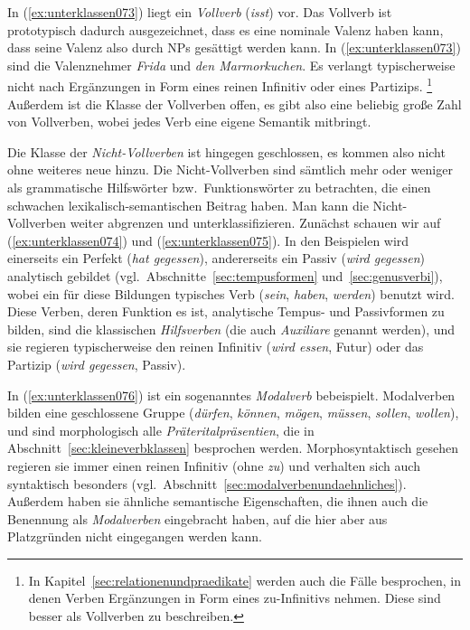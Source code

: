 In (\ref{ex:unterklassen073}) liegt ein \textit{Vollverb} (\textit{isst}) vor.
Das Vollverb ist prototypisch dadurch ausgezeichnet, dass es eine nominale Valenz haben kann, dass seine Valenz also durch NPs gesättigt werden kann.
In (\ref{ex:unterklassen073}) sind die Valenznehmer \textit{Frida} und \textit{den Marmorkuchen}.
Es verlangt typischerweise nicht nach Ergänzungen in Form eines reinen Infinitiv oder eines Partizips.%
\footnote{In Kapitel~\ref{sec:relationenundpraedikate} werden auch die Fälle besprochen, in denen Verben Ergänzungen in Form eines zu-Infinitivs nehmen.
Diese sind besser als Vollverben zu beschreiben.}
Außerdem ist die Klasse der Vollverben offen, es gibt also eine beliebig große Zahl von Vollverben, wobei jedes Verb eine eigene Semantik mitbringt.


Die Klasse der \textit{Nicht-Vollverben} ist hingegen geschlossen, es kommen also nicht ohne weiteres neue hinzu.
Die Nicht-Vollverben sind sämtlich mehr oder weniger als grammatische Hilfswörter bzw.\ Funktionswörter zu betrachten, die einen schwachen lexikalisch-semantischen Beitrag haben.
Man kann die Nicht-Vollverben weiter abgrenzen und unterklassifizieren.
Zunächst schauen wir auf (\ref{ex:unterklassen074}) und (\ref{ex:unterklassen075}).
In den Beispielen wird einerseits ein Perfekt (\textit{hat gegessen}), andererseits ein Passiv (\textit{wird gegessen}) analytisch gebildet (vgl.\ Abschnitte~\ref{sec:tempusformen} und~\ref{sec:genusverbi}), wobei ein für diese Bildungen typisches Verb (\textit{sein}, \textit{haben}, \textit{werden}) benutzt wird.
Diese Verben, deren Funktion es ist, analytische Tempus- und Passivformen zu bilden, sind die klassischen \textit{Hilfsverben} (die auch \textit{Auxiliare} genannt werden), und sie regieren typischerweise den reinen Infinitiv (\textit{wird essen}, Futur) oder das Partizip (\textit{wird gegessen}, Passiv).


In (\ref{ex:unterklassen076}) ist ein sogenanntes \textit{Modalverb} bebeispielt.
Modalverben bilden eine geschlossene Gruppe (\textit{dürfen}, \textit{können}, \textit{mögen}, \textit{müssen}, \textit{sollen}, \textit{wollen}), und sind morphologisch alle \textit{Präteritalpräsentien}, die in Abschnitt~\ref{sec:kleineverbklassen} besprochen werden.
Morphosyntaktisch gesehen regieren sie immer einen reinen Infinitiv (ohne \textit{zu}) und verhalten sich auch syntaktisch besonders (vgl.\ Abschnitt~\ref{sec:modalverbenundaehnliches}).
Außerdem haben sie ähnliche semantische Eigenschaften, die ihnen auch die Benennung als \textit{Modalverben} eingebracht haben, auf die hier aber aus Platzgründen nicht eingegangen werden kann.

